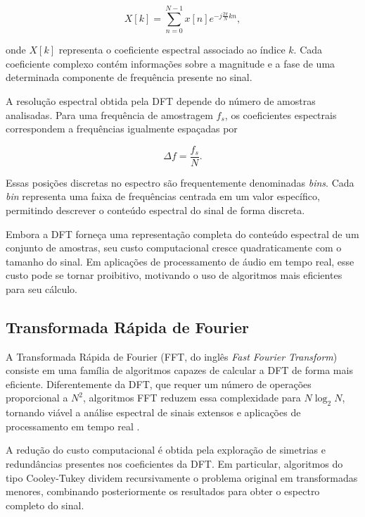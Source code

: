 \begin{equation}
X[k] = \sum_{n=0}^{N-1} x[n] e^{-j\frac{2\pi}{N}kn},
\end{equation}

onde \(X[k]\) representa o coeficiente espectral associado ao índice \(k\). Cada coeficiente complexo contém informações sobre a magnitude e a fase de uma determinada componente de frequência presente no sinal.

A resolução espectral obtida pela DFT depende do número de amostras analisadas. Para uma frequência de amostragem \(f_s\), os coeficientes espectrais correspondem a frequências igualmente espaçadas por

\begin{equation}
\Delta f = \frac{f_s}{N}.
\end{equation}

Essas posições discretas no espectro são frequentemente denominadas \textit{bins}. Cada \textit{bin} representa uma faixa de frequências centrada em um valor específico, permitindo descrever o conteúdo espectral do sinal de forma discreta.

Embora a DFT forneça uma representação completa do conteúdo espectral de um conjunto de amostras, seu custo computacional cresce quadraticamente com o tamanho do sinal. Em aplicações de processamento de áudio em tempo real, esse custo pode se tornar proibitivo, motivando o uso de algoritmos mais eficientes para seu cálculo.

\subsection{Transformada Rápida de Fourier}

A Transformada Rápida de Fourier (FFT, do inglês \textit{Fast Fourier Transform}) consiste em uma família de algoritmos capazes de calcular a DFT de forma mais eficiente. Diferentemente da DFT, que requer um número de operações proporcional a \(N^2\), algoritmos FFT reduzem essa complexidade para \(N \log_2 N\), tornando viável a análise espectral de sinais extensos e aplicações de processamento em tempo real \cite{cooley1965}.

A redução do custo computacional é obtida pela exploração de simetrias e redundâncias presentes nos coeficientes da DFT. Em particular, algoritmos do tipo Cooley-Tukey dividem recursivamente o problema original em transformadas menores, combinando posteriormente os resultados para obter o espectro completo do sinal.

